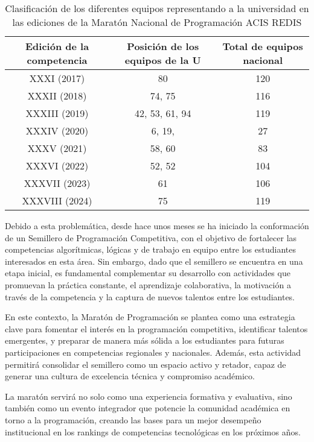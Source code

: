 \documentclass{article}
\begin{document}
\begin{table}[h]
  \centering
  \begin{tabular}{|c|c|c|}
    \hline
    Edición de la competencia& Posición de los equipos de la U& Total de equipos nacional \\ \hline
    XXXI (2017) & 80 & 120 \\ \hline
    XXXII (2018) & 74, 75 & 116 \\ \hline
    XXXIII (2019) & 42, 53, 61, 94 & 119 \\ \hline
    XXXIV (2020) & 6, 19, & 27 \\ \hline
    XXXV (2021) & 58, 60 & 83 \\ \hline
    XXXVI (2022) & 52, 52 & 104 \\ \hline
    XXXVII (2023) & 61 & 106 \\ \hline
    XXXVIII (2024) & 75 & 119 \\ \hline
  \end{tabular}
  \caption{Clasificación de los diferentes equipos representando a la universidad en las ediciones de la Maratón Nacional de Programación ACIS REDIS\cite{icpc2024,icpc2023,icpc2022,icpc2021,icpc2020,icpc2019,icpc2018}}
  \label{tab:resultados-competencias}
\end{table}


Debido a esta problemática, desde hace unos meses se ha iniciado la conformación de un Semillero de Programación Competitiva\cite{pcutadeo_github}, con el objetivo de fortalecer las competencias algorítmicas, lógicas y de trabajo en equipo entre los estudiantes interesados en esta área. Sin embargo, dado que el semillero se encuentra en una etapa inicial, es fundamental complementar su desarrollo con actividades que promuevan la práctica constante, el aprendizaje colaborativa, la motivación a través de la competencia y la captura de nuevos talentos entre los estudiantes.

En este contexto, la Maratón de Programación se plantea como una estrategia clave para fomentar el interés en la programación competitiva, identificar talentos emergentes, y preparar de manera más sólida a los estudiantes para futuras participaciones en competencias regionales y nacionales. Además, esta actividad permitirá consolidar el semillero como un espacio activo y retador, capaz de generar una cultura de excelencia técnica y compromiso académico.

La maratón servirá no solo como una experiencia formativa y evaluativa, sino también como un evento integrador que potencie la comunidad académica en torno a la programación, creando las bases para un mejor desempeño institucional en los rankings de competencias tecnológicas en los próximos años.
\end{document}
